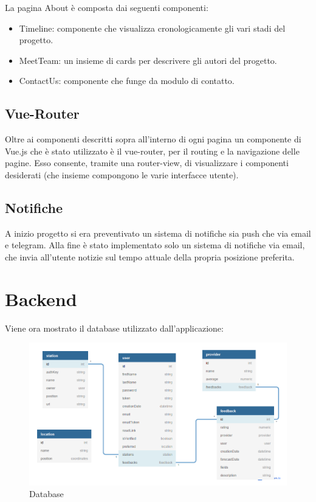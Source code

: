 La pagina About è composta dai seguenti componenti:
\begin{itemize}
    \item Timeline: componente che visualizza cronologicamente gli vari stadi del progetto.
    \item MeetTeam: un insieme di cards per descrivere gli autori del progetto. 
    \item ContactUs: componente che funge da modulo di contatto.
\end{itemize}
\subsection{Vue-Router}
Oltre ai componenti descritti sopra all'interno di ogni pagina un componente di Vue.js che è stato utilizzato è il vue-router, per il routing e la navigazione delle pagine.
Esso consente, tramite una router-view, di visualizzare i componenti
desiderati (che insieme compongono le varie interfacce utente).
\subsection{Notifiche}
A inizio progetto si era preventivato un sistema di notifiche sia push che via email e telegram. 
Alla fine è stato implementato solo un sistema di notifiche via email, che invia all'utente notizie sul tempo attuale della propria posizione preferita. 





\section{Backend}
Viene ora mostrato il database utilizzato dall'applicazione:
\begin{figure}[H]
    \caption{Database}
    \label{fig:Database}
    \centering
    \includegraphics[width=1.0\textwidth]{DrawIo/database.png}
\end{figure}
